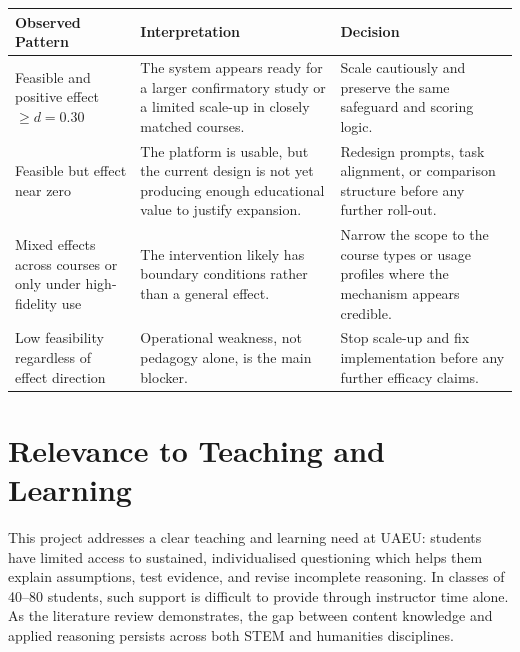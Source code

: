 \documentclass[11pt,a4paper]{article}
\begin{document}
\begin{tabularx}{\textwidth}{|L{3.5cm}|X|L{3.8cm}|}
\hline
{}
\textbf{Observed Pattern} & \textbf{Interpretation} & \textbf{Decision} \\ \hline
Feasible and positive effect $\geq d = 0.30$ & The system appears ready for a larger confirmatory study or a limited scale-up in closely matched courses. & Scale cautiously and preserve the same safeguard and scoring logic. \\ \hline
Feasible but effect near zero & The platform is usable, but the current design is not yet producing enough educational value to justify expansion. & Redesign prompts, task alignment, or comparison structure before any further roll-out. \\ \hline
Mixed effects across courses or only under high-fidelity use & The intervention likely has boundary conditions rather than a general effect. & Narrow the scope to the course types or usage profiles where the mechanism appears credible. \\ \hline
Low feasibility regardless of effect direction & Operational weakness, not pedagogy alone, is the main blocker. & Stop scale-up and fix implementation before any further efficacy claims. \\ \hline
\end{tabularx}


\section{Relevance to Teaching and Learning}

This project addresses a clear teaching and learning need at UAEU: students have limited access to sustained, individualised questioning which helps them explain assumptions, test evidence, and revise incomplete reasoning. In classes of 40--80 students, such support is difficult to provide through instructor time alone. As the literature review demonstrates, the gap between content knowledge and applied reasoning persists across both STEM and humanities disciplines.
\end{document}
